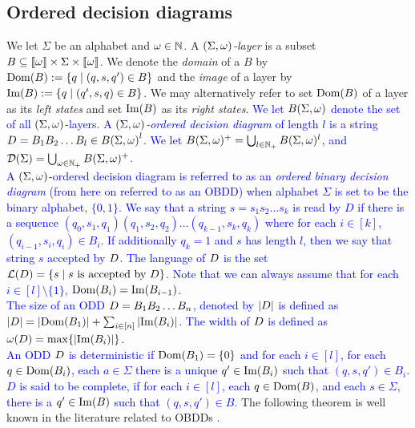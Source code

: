 \subsection{Ordered decision diagrams} 
We let $\Sigma$ be an alphabet and $\omega \in \mathbb{N}$. A  $(\Sigma, \omega)$\emph{-layer} is a subset $B \subseteq \llbracket \omega \rrbracket \times \Sigma \times \llbracket \omega \rrbracket$. We denote the \emph{domain} of a $B$ by $\mathrm{Dom}(B):= \{q \;|\; (q,s,q') \in B\}$ and the \emph{image} of a layer by $\mathrm{Im}(B):= \{q \;|\; (q',s,q) \in B\}$. We may alternatively refer to set $\mathrm{Dom}(B)$ of a layer as its \textit{left states} and set \textit{$\mathrm{Im}(B)$} as its \textit{right states}.
\textcolor{blue}{
We let  $B(\Sigma, \omega)$ denote the set of all $(\Sigma,\omega)$-layers. A $(\Sigma,\omega)$\emph{-ordered decision diagram} of length $l$ is a string $D = B_1B_2\ldots B_l \in {B(\Sigma, \omega)}^l$. We let $B(\Sigma,\omega)^{+} = \bigcup_{l\in \mathbb{N}_+}B(\Sigma,\omega)^{l}$, and $\mathcal{D}(\Sigma) = \bigcup_{\omega\in \mathbb{N}_+} B(\Sigma,\omega)^+$. 
\\ 
A $(\Sigma,\omega)$-ordered decision diagram is referred to as an \emph{ordered binary decision diagram} (from here on referred to as an OBDD) when alphabet $\Sigma$ is set to be the binary alphabet, $\{0,1\}$. We say that a string $s=s_1 s_2 \ldots s_k$ is read by $D$ if there is a sequence $(q_0, s_1,q_1)(q_1,s_2,q_2)\ldots(q_{k-1},s_k,q_k)$ where for each $i \in [k]$, $(q_{i-1},s_i,q_i) \in B_i$. If additionally $q_k = 1$ and $s$ has length $l$, then we say that string $s$ accepted by $D$. The language of $D$ is the set $\mathcal{L}(D)= \{s\; | \; s \text{ is accepted by } D\}$. Note that we can always assume that for each $i \in [l] \setminus \{1\}$, $\mathrm{Dom}(B_i) = \mathrm{Im}(B_{i-1})$. \
\\
The size of an ODD $D = B_1B_2\dots B_n$, denoted by $|D|$ 
is defined as $|D| = |\mathrm{Dom}(B_1)|+\sum_{i\in [n]} |\mathrm{Im}(B_i)|$. The width 
of $D$ is defined as $\omega(D) = \max\{|\mathrm{Im}(B_i)|\}$. 
\\ 
An ODD $D$ is deterministic if $\mathrm{Dom}(B_1) = \{0\}$ and for each $i \in [l]$, for each $q \in \mathrm{Dom}(B_i)$, each $a \in \Sigma$ there is a unique $q'\in \mathrm{Im}(B_i)$ such that $(q,s,q') \in B_i$. $D$ is said to be complete, if for each 
$i\in [l]$, each $q\in \mathrm{Dom}(B)$, and each $s\in \Sigma$, 
there is a $q'\in \mathrm{Im}(B)$ such that $(q,s,q')\in B$.
}
The following theorem is well known in the literature related to OBDDs \cite{bryant1986graph}. 


